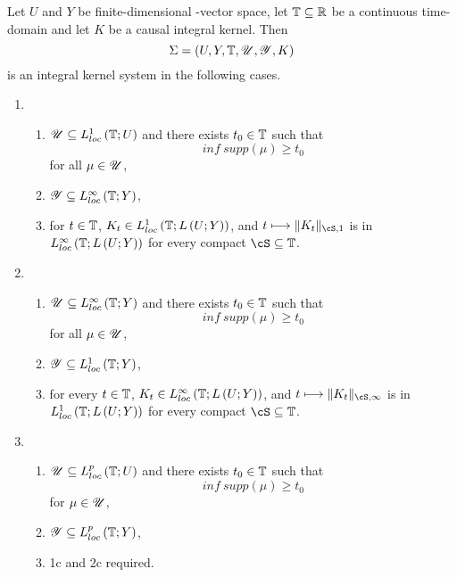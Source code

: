 \begin{theorem}
	Let  $U$ and $Y$ be finite-dimensional \real-vector space, let $\mathbb{T} \subseteq \mathbb{R}$ be a continuous time-domain and let $K$ be a causal integral kernel. Then 
	\[
	\Sigma = \left( U, Y, \mathbb{T} , \mathscr{U}, \mathscr{Y}, K \right)
	\] 
	is an integral kernel system in the following cases. 
	\begin{enumerate}
		\item 
			\begin{enumerate}
				\item $\mathscr{U} \subseteq L^{1}_{loc}\left( \mathbb{T} ; U \right) $ and there exists $t_0 \in  \mathbb{T} $ such that 
					\[
						inf\ supp\left( \mu \right) \ge t_0
					\] 
					for all $\mu \in \mathscr{U}$,
				\item $\mathscr{Y} \subseteq L^{\infty}_{loc}\left( \mathbb{T} ; Y \right) $, 
				\item for $t \in  \mathbb{T} $, $K_t \in  L^{1}_{loc}\left( \mathbb{T} ; L\left( U; Y \right)  \right) $, and $t \longmapsto \|K_t\|_{\cS , 1}$ is in $L^{\infty}_{loc}\left( \mathbb{T} ; L\left( U; Y \right)  \right) $ for every compact $\cS \subseteq \tdomain $. 
			\end{enumerate}
		\item 
			\begin{enumerate}
				\item $\mathscr{U} \subseteq L^{\infty}_{loc}\left( \mathbb{T} ; Y \right) $ and there exists $t_0 \in  \mathbb{T} $ such that 
					\[
						inf\ supp\left( \mu \right) \ge t_0
					\] 
					for all $\mu \in \mathscr{U}$,
				\item $\mathscr{Y} \subseteq L^{1}_{loc}\left( \mathbb{T} ; Y \right) $, 
				\item for every $t \in  \mathbb{T} $, $K_t \in  L^{\infty}_{loc}\left( \mathbb{T} ; L\left( U; Y \right)  \right) $, and $t \longmapsto \|K_t\|_{\cS , \infty}$ is in $L^{1}_{loc}\left( \mathbb{T} ; L\left( U; Y \right)  \right) $ for every compact $\cS \subseteq \tdomain $. 
			\end{enumerate}
		\item 
			\begin{enumerate}
				\item $\mathscr{U} \subseteq L^{p}_{loc}\left( \mathbb{T} ; U \right) $ and there exists $t_0 \in  \mathbb{T} $ such that 
					\[
						inf\ supp\left( \mu \right) \ge t_0
					\] 
					for $\mu \in  \mathscr{U}$, 
				\item $\mathscr{Y} \subseteq L^{p }_{loc}\left( \mathbb{T} ; Y \right) $, 
				\item 1c and 2c required.
			\end{enumerate}
	\end{enumerate}
\end{theorem}
